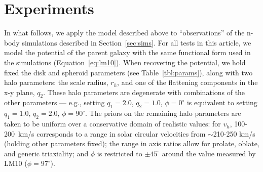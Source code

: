 \documentclass[letterpaper,12pt,preprint]{aastex}
\begin{document}
\section{Experiments}
In what follows, we apply the model described above to ``observations'' of the n-body simulations described in Section~\ref{sec:sims}. For all tests in this article, we model the potential of the parent galaxy with the same functional form used in the simulations (Equation~\ref{eq:lm10}). When recovering the potential, we hold fixed the disk and spheroid parameters (see Table~\ref{tbl:params}), along with two halo parameters: the scale radius, $r_h$, and one of the flattening components in the x-y plane, $q_2$. These halo parameters are degenerate with combinations of the other parameters --- e.g., setting $q_1=2.0$, $q_2=1.0$, $\phi=0^\circ$ is equivalent to setting $q_1=1.0$, $q_2=2.0$, $\phi=90^\circ$. The priors on the remaining halo parameters are taken to be uniform over a conservative domain of realistic values: for $v_h$, 100-200~km/s corresponds to a range in solar circular velocities from $\sim$210-250 km/s (holding other parameters fixed); the range in axis ratios allow for prolate, oblate, and generic triaxiality; and $\phi$ is restricted to $\pm45^\circ$ around the value measured by LM10 ($\phi = 97^\circ$).
\end{document}
